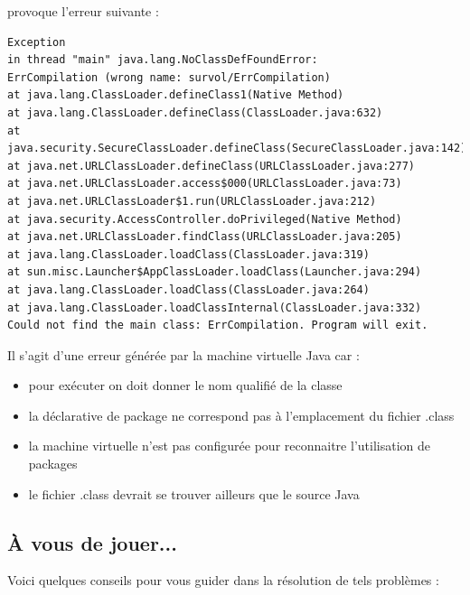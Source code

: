\documentclass[11pt,a4paper]{article}
\begin{document}
							provoque l'erreur suivante :
							\begin{scriptsize}\begin{verbatim}
Exception
in thread "main" java.lang.NoClassDefFoundError:
ErrCompilation (wrong name: survol/ErrCompilation)
at java.lang.ClassLoader.defineClass1(Native Method)
at java.lang.ClassLoader.defineClass(ClassLoader.java:632)
at java.security.SecureClassLoader.defineClass(SecureClassLoader.java:142)
at java.net.URLClassLoader.defineClass(URLClassLoader.java:277)
at java.net.URLClassLoader.access$000(URLClassLoader.java:73)
at java.net.URLClassLoader$1.run(URLClassLoader.java:212)
at java.security.AccessController.doPrivileged(Native Method)
at java.net.URLClassLoader.findClass(URLClassLoader.java:205)
at java.lang.ClassLoader.loadClass(ClassLoader.java:319)
at sun.misc.Launcher$AppClassLoader.loadClass(Launcher.java:294)
at java.lang.ClassLoader.loadClass(ClassLoader.java:264)
at java.lang.ClassLoader.loadClassInternal(ClassLoader.java:332)
Could not find the main class: ErrCompilation. Program will exit.
							\end{verbatim}\end{scriptsize}
								Il s'agit d'une erreur g\'en\'er\'ee par la machine virtuelle Java car :
							
            \par
        
            \begin{itemize} 
        
            \item[ \ding{"6D} ] pour ex\'ecuter on doit donner le nom qualifi\'e de la classe
        
            \item[ \ding{"6D} ] la d\'eclarative de package ne correspond pas \`a l'emplacement du fichier .class
        
            \item[ \ding{"6D} ] la machine virtuelle n'est pas configur\'ee pour reconnaitre l'utilisation de packages
        
            \item[ \ding{"6D} ] le fichier .class devrait se trouver ailleurs que le source Java
        
            \end{itemize} 
        \subsection{\`A vous de jouer...}
          Voici quelques conseils pour vous guider dans la r\'esolution de tels probl\`emes :
          
\end{document}
